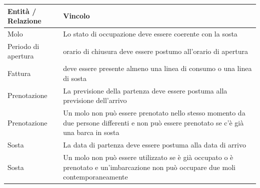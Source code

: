 \begin{center}
    \begin{tabularx}{\textwidth}{|p{30mm}|X|}
        \hline
        \rowcolor{gray!30}
        \textbf{Entità / Relazione} & \textbf{Vincolo}\\
        \hline
        Molo & Lo stato di occupazione deve essere coerente con la sosta\\
        \hline

        Periodo di apertura & orario di chiusura deve essere postumo all'orario di apertura \\
        \hline

        Fattura & deve essere presente almeno una linea di consumo o una linea di sosta\\
        \hline

        Prenotazione & La previsione della partenza deve essere postuma alla previsione dell'arrivo\\
        \hline

        Prenotazione & Un molo non può essere prenotato nello stesso momento da due persone differenti e non può essere prenotato se c'è già una barca in sosta\\
        \hline

        Sosta & La data di partenza deve essere postuma alla data di arrivo\\

        \hline
        Sosta & Un molo non può essere utilizzato se è già occupato o è prenotato e un'imbarcazione non può occupare due moli contemporaneamente\\

        \hline
    \end{tabularx}
\end{center}
